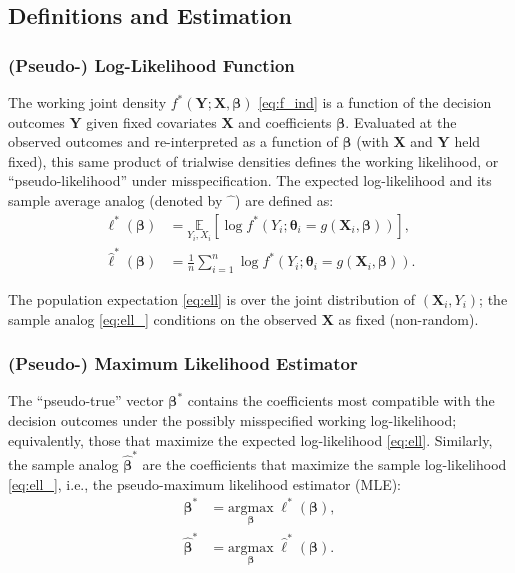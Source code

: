 \documentclass[00-main.tex]{subfiles}
\begin{document}
\subsection{Definitions and Estimation}
\subsubsection{(Pseudo-) Log-Likelihood Function}
The working joint density $f^*(\bm{Y}; \bm{X}, \bm\beta)$ \eqref{eq:f_ind} is a function of the decision outcomes $\bm{Y}$ given fixed covariates $\bm{X}$ and coefficients $\bm\beta$. Evaluated at the observed outcomes and re-interpreted as a function of $\bm\beta$ (with $\bm{X}$ and $\bm{Y}$ held fixed), this same product of trialwise densities defines the working likelihood, or ``pseudo-likelihood'' under misspecification. The expected log-likelihood and its sample average analog (denoted by $\hat{\phantom{x}}$) are defined as:
\begin{subequations}
\begin{align}
    \ell^* (\bm{\beta}) &= \underset{Y_i, X_i}{\mathbb{E}}[\log f^*(Y_i; \bm\theta_i = g(\bm{X}_i, \bm{\beta}))],\label{eq:ell}\\
    \hat\ell^* (\bm{\beta}) &= \frac{1}{n}\sum_{i=1}^n \log f^*(Y_i ; \bm{\theta}_i = g(\bm{X}_i, \bm{\beta})).\label{eq:ell_}
\end{align}
\end{subequations}

The population expectation \eqref{eq:ell} is over the joint distribution of $(\bm{X}_i, Y_i)$; the sample analog \eqref{eq:ell_} conditions on the observed $\bm{X}$ as fixed (non-random).

\subsubsection{(Pseudo-) Maximum Likelihood Estimator}
The ``pseudo-true'' vector $\bm\beta^*$ contains the coefficients most compatible with the decision outcomes under the possibly misspecified working log-likelihood; equivalently, those that maximize the expected log-likelihood \eqref{eq:ell}. Similarly, the sample analog $\hat{\bm\beta}^*$ are the coefficients that maximize the sample log-likelihood \eqref{eq:ell_}, i.e., the pseudo-maximum likelihood estimator (MLE):
\begin{subequations}
\begin{align}
   \bm{\beta}^* &= \underset{\bm{\beta}}{\text{argmax}}\;\ell^* (\bm{\beta}),\label{eq:beta}\\
    \hat{\bm{\beta}}^* &= \underset{\bm{\beta}}{\text{argmax}}\;\hat\ell^* (\bm{\beta}).\label{eq:beta_}
\end{align}
\end{subequations}
\end{document}
